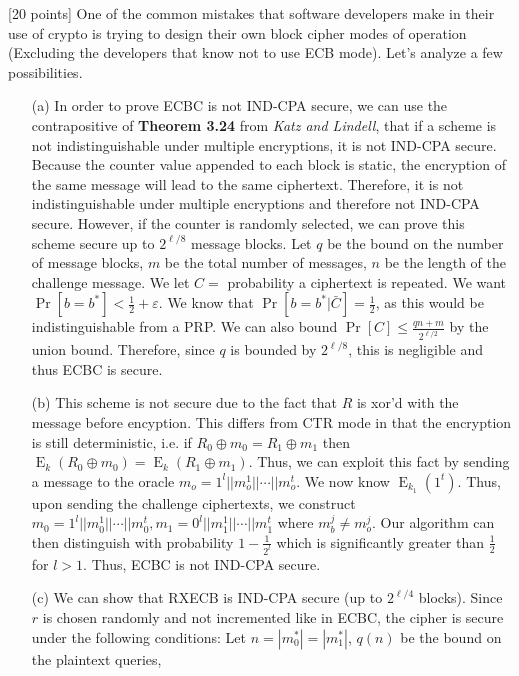 \documentclass[11pt]{article}
\newcounter{qnum}
\newcommand{\question}[1]{\stepcounter{qnum}\bigskip\noindent{\bf \arabic{qnum}. #1.}}
\newcommand{\E}{\mathop{\textrm{E}}}
\begin{document}
\question{Block Cipher Modes} [20 points]  One of the common mistakes
that software developers make in their use of crypto is trying to
design their own block cipher modes of operation (Excluding the
developers that know not to use ECB mode).  Let's analyze a few
possibilities. 
\begin{itemize}
\item[(a)] In order to prove ECBC is not IND-CPA secure, we can use the contrapositive 
  of \textbf{ Theorem 3.24 } from \textit{Katz and Lindell}, that if a scheme is not 
  indistinguishable under multiple encryptions, it is not IND-CPA secure. Because the counter
  value appended to each block is static, the encryption of the same message will lead
  to the same ciphertext. Therefore, it is not indistinguishable under multiple encryptions and 
  therefore not IND-CPA secure. However, if the counter is randomly selected, we can prove this 
  scheme secure up to $2^{\ell / 8}$ message blocks. Let $q$ be the bound on the number of
  message blocks, $m$ be the total number of messages, $n$ be the length of the challenge
  message. We let $C = $ probability a ciphertext is repeated. We want 
  $\Pr[b=b^*] < \frac{1}{2} + \varepsilon$. We know that $\Pr[b=b^*| \bar C] = \frac{1}{2}$, as
  this would be indistinguishable from a PRP. We can also bound $\Pr[C] \leq
  \frac{qn+m}{2^{\ell/2}}$ by the union bound. Therefore, since $q$ is bounded by 
  $2^{\ell/8}$, this is negligible and thus ECBC is secure.
\item[(b)] 
  This scheme is not secure due to the fact that $R$ is xor'd with the message before encyption.
  This differs from CTR mode in that the encryption is still deterministic,  i.e. if $R_0 \oplus
  m_0 = R_1 \oplus m_1$ then $\E_k(R_0 \oplus m_0) = \E_k(R_1 \oplus m_1)$. Thus, we can 
  exploit this fact by sending a message to the oracle $m_o = 1^l || m_o^1 || \cdots || m_o^t$. We
  now know $\E_{k_1}(1^t)$. Thus, upon sending the challenge ciphertexts, we construct
  $m_0 = 1^l || m_0^1 || \cdots ||  m_0^t, m_1 = 0^l || m_1^1 || \cdots || m_1^t$ where 
  $m_b^j \neq m_o^j$. Our algorithm can then distinguish with probability $1 - \frac{1}{2^l}$ which 
  is significantly greater than $\frac{1}{2}$ for $l > 1$. Thus, ECBC is not IND-CPA secure.
\item[(c)] 
  We can show that RXECB is IND-CPA secure (up to $2^{\ell/4}$ blocks). Since $r$ is chosen randomly
  and not incremented like in ECBC, the cipher is secure under the following conditions:
  Let $n = |m_0^*| = |m_1^*|$, $q(n)$ be the bound on the plaintext queries, 

\end{itemize}
\end{document}

